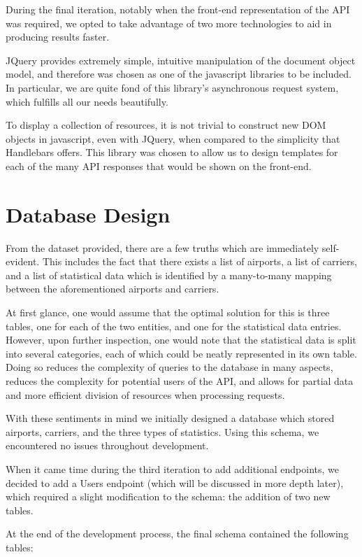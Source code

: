 \documentclass[12pt, a4paper, notitlepage]{report}
\begin{document}
		During the final iteration, notably when the front-end representation of the API was required, we opted to take advantage of two more technologies to aid in producing results faster.
		
		JQuery provides extremely simple, intuitive manipulation of the document object model, and therefore was chosen as one of the javascript libraries to be included. In particular, we are quite fond of this library's asynchronous request system, which fulfills all our needs beautifully.
		
		To display a collection of resources, it is not trivial to construct new DOM objects in javascript, even with JQuery, when compared to the simplicity that Handlebars offers. This library was chosen to allow us to design templates for each of the many API responses that would be shown on the front-end.
		
	\section*{Database Design}
		From the dataset provided, there are a few truths which are immediately self-evident. This includes the fact that there exists a list of airports, a list of carriers, and a list of statistical data which is identified by a many-to-many mapping between the aforementioned airports and carriers.
		
		At first glance, one would assume that the optimal solution for this is three tables, one for each of the two entities, and one for the statistical data entries. However, upon further inspection, one would note that the statistical data is split into several categories, each of which could be neatly represented in its own table. Doing so reduces the complexity of queries to the database in many aspects, reduces the complexity for potential users of the API, and allows for partial data and more efficient division of resources when processing requests.
		
		With these sentiments in mind we initially designed a database which stored airports, carriers, and the three types of statistics. Using this schema, we encountered no issues throughout development.
		
		When it came time during the third iteration to add additional endpoints, we decided to add a Users endpoint (which will be discussed in more depth later), which required a slight modification to the schema: the addition of two new tables.
		
		At the end of the development process, the final schema contained the following tables:
		
\end{document}
